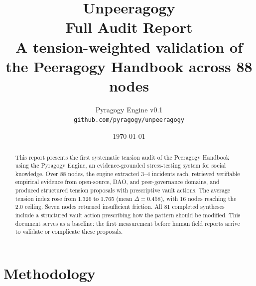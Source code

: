\documentclass[11pt,a4paper]{article}
\begin{document}
\title{\textbf{Unpeeragogy}\\\large Full Audit Report\\\small A tension-weighted validation of the Peeragogy Handbook across 88 nodes}
\author{Pyragogy Engine v0.1 \\ \texttt{github.com/pyragogy/unpeeragogy}}
\date{\today}
\maketitle

\begin{abstract}
This report presents the first systematic tension audit of the Peeragogy Handbook using the Pyragogy Engine, an evidence-grounded stress-testing system for social knowledge. Over 88 nodes, the engine extracted 3--4 incidents each, retrieved verifiable empirical evidence from open-source, DAO, and peer-governance domains, and produced structured tension proposals with prescriptive vault actions. The average tension index rose from 1.326 to 1.765 (mean $\Delta = 0.458$), with 16 nodes reaching the 2.0 ceiling. Seven nodes returned insufficient friction. All 81 completed syntheses include a structured vault action prescribing how the pattern should be modified. This document serves as a baseline: the first measurement before human field reports arrive to validate or complicate these proposals.
\end{abstract}

\section{Methodology}
\end{document}
